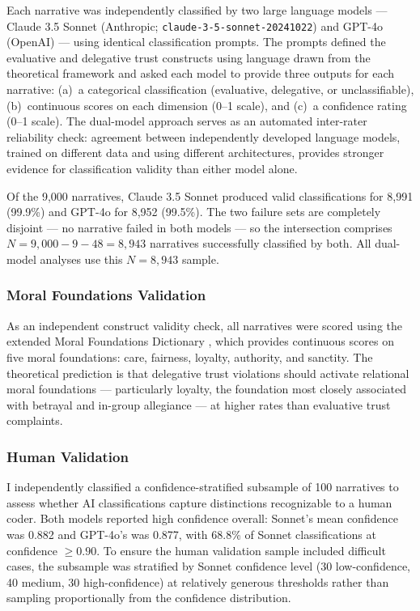 Each narrative was independently classified by two large language models --- Claude 3.5 Sonnet (Anthropic; \texttt{claude-3-5-sonnet-20241022}) and GPT-4o (OpenAI) --- using identical classification prompts. The prompts defined the evaluative and delegative trust constructs using language drawn from the theoretical framework and asked each model to provide three outputs for each narrative: (a)~a categorical classification (evaluative, delegative, or unclassifiable), (b)~continuous scores on each dimension (0--1 scale), and (c)~a confidence rating (0--1 scale). The dual-model approach serves as an automated inter-rater reliability check: agreement between independently developed language models, trained on different data and using different architectures, provides stronger evidence for classification validity than either model alone.

Of the 9,000 narratives, Claude 3.5 Sonnet produced valid classifications for 8,991 (99.9\%) and GPT-4o for 8,952 (99.5\%). The two failure sets are completely disjoint --- no narrative failed in both models --- so the intersection comprises $N = 9{,}000 - 9 - 48 = 8{,}943$ narratives successfully classified by both. All dual-model analyses use this $N = 8{,}943$ sample.

\subsubsection{Moral Foundations Validation}

As an independent construct validity check, all narratives were scored using the extended Moral Foundations Dictionary \citep[eMFD;][]{Hopp2021}, which provides continuous scores on five moral foundations: care, fairness, loyalty, authority, and sanctity. The theoretical prediction is that delegative trust violations should activate relational moral foundations --- particularly loyalty, the foundation most closely associated with betrayal and in-group allegiance --- at higher rates than evaluative trust complaints.

\subsubsection{Human Validation}

I independently classified a confidence-stratified subsample of 100 narratives to assess whether AI classifications capture distinctions recognizable to a human coder. Both models reported high confidence overall: Sonnet's mean confidence was 0.882 and GPT-4o's was 0.877, with 68.8\% of Sonnet classifications at confidence $\geq 0.90$. To ensure the human validation sample included difficult cases, the subsample was stratified by Sonnet confidence level (30 low-confidence, 40 medium, 30 high-confidence) at relatively generous thresholds rather than sampling proportionally from the confidence distribution.

